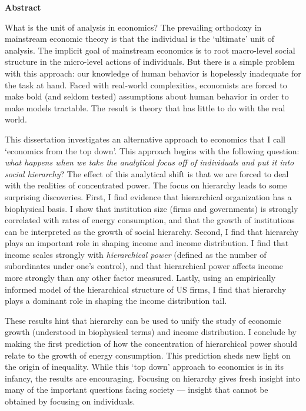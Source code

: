 
\newpage
{}
\vspace*{\fill}
{

	
	\begin{center}
		\textbf{Abstract}	
	\end{center}
	

What is the unit of analysis in economics?  The prevailing orthodoxy in mainstream economic theory is that the individual is the `ultimate' unit of analysis.  The implicit goal of mainstream economics  is to  root macro-level social structure in the micro-level actions of individuals.  But there is a simple problem with this approach: our knowledge of human behavior is hopelessly inadequate for the task at hand.  Faced with real-world complexities, economists are forced to make bold (and seldom tested) assumptions about human behavior in order to make models tractable.  The result is theory that has little to do with the real world.  

This dissertation investigates an alternative approach to economics  that I call `economics from the top down'. This approach begins with the following question:  \textit{what happens when we take the analytical focus off of individuals and put it into social hierarchy}?   The effect of this analytical  shift is that we are forced to deal with the realities of concentrated power.  The focus on hierarchy leads to some surprising discoveries.  First, I find evidence that hierarchical organization has a biophysical basis.  I show that institution size (firms and governments) is strongly correlated with rates of energy consumption, and that the growth of institutions can be interpreted as the growth of social hierarchy.  Second, I find that hierarchy plays an important role in shaping income and income distribution. I find that income scales strongly with \textit{hierarchical power} (defined as the number of subordinates under one's control),  and that hierarchical power affects income more strongly than any other factor measured.  Lastly, using an empirically informed model of the hierarchical structure of US firms,  I find that hierarchy plays a dominant role in shaping the income distribution tail.  

These results hint that hierarchy can be used to unify the study of economic growth (understood in biophysical terms) and income distribution.  I conclude by making the first prediction of how the concentration of hierarchical power should relate to the growth of energy consumption. This prediction sheds new light on the origin of inequality.  While this `top down' approach to economics  is in its infancy, the results are encouraging.  Focusing on hierarchy  gives fresh insight into many of the important questions facing society --- insight that cannot be obtained by focusing on individuals. 




	
}
\vspace*{\fill}


